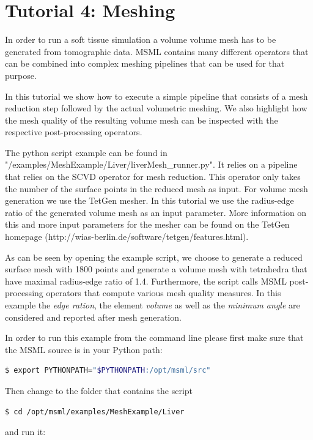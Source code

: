 \chapter{Tutorial 4: Meshing}

In order to run a soft tissue simulation a volume volume mesh has to be generated from tomographic data. MSML contains many different operators that can be combined into complex meshing pipelines that can be used for that purpose.

In this tutorial we show how to execute a simple pipeline that consists of a mesh reduction step followed by the actual volumetric meshing. We also highlight how the mesh quality of the resulting volume mesh can be inspected with the respective post-processing operators.

The python script example can be found in "/examples/MeshExample/Liver/liverMesh\_runner.py". It relies on a pipeline that relies on the SCVD operator for mesh reduction. This operator only takes the number of the surface points in the reduced mesh as input. For volume mesh generation we use the TetGen mesher. In this tutorial we use the radius-edge ratio of the generated volume mesh as an input parameter. More information on this and more input parameters for the mesher can be found on the TetGen homepage (http://wias-berlin.de/software/tetgen/features.html).

As can be seen by opening the example script, we choose to generate a reduced surface mesh with 1800 points and generate a volume mesh with tetrahedra that have maximal radius-edge ratio of 1.4. Furthermore, the script calls MSML post-processing operators that compute various mesh quality measures. In this example the \emph{edge ration}, the element \emph{volume} as well as the \emph{minimum angle} are considered and reported after mesh generation.


In order to run this example from the command line please first make sure that the MSML source is in your Python path:
\begin{lstlisting}[language=sh, breaklines=true]
$ export PYTHONPATH="$PYTHONPATH:/opt/msml/src"
\end{lstlisting}

Then change to the folder that contains the script

\begin{lstlisting}[language=sh, breaklines=true]
$ cd /opt/msml/examples/MeshExample/Liver
\end{lstlisting}

and run it:

